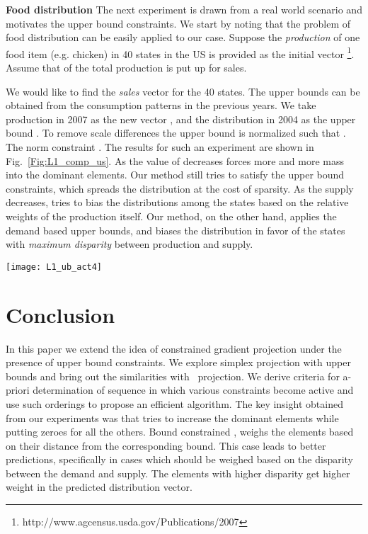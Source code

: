 \documentclass{article}
\def\Lo{~}
\begin{document}
\textbf{Food distribution}
The next experiment is drawn from a real world scenario and motivates the upper bound constraints.
We start by noting that the problem of food distribution can be easily applied to our case. Suppose the \textit{production} of one food item (e.g. chicken) in 40 states in the US is provided as the initial vector \footnote{http://www.agcensus.usda.gov/Publications/2007}. Assume that  of the total production is put up for sales.

We would like to find the \textit{sales} vector  for the 40 states. The upper bounds can be obtained from the consumption patterns in the previous years. We take production in 2007 as the new vector , and the distribution in 2004 as the upper bound . To remove scale differences the upper bound is normalized such that . The norm constraint . The results for such an experiment are shown in Fig.~\ref{Fig:L1_comp_us}. As the value of  decreases  forces more and more mass into the dominant elements. Our method still tries to satisfy the upper bound constraints, which spreads the distribution at the cost of sparsity. As the supply decreases,  tries to bias the distributions among the states based on the relative weights of the production itself. Our method, on the other hand, applies the demand based upper bounds, and biases the distribution in favor of the states with \textit{maximum disparity} between production and supply.
\begin{figure*}[htbp!]
\centering
  \texttt{[image: L1\_ub\_act4]}
  \caption{Red: Actual sales of Chicken in 40 states in 2007. Blue: our method with upper bounds. Green:  only. Note the small region in the circle which has been enlarged.  completely misses this region whereas our method still provides some value to it.\label{Fig:L1_comp_us}
}
\end{figure*}


\section{Conclusion}\label{SEC:Concl}
In this paper we extend the idea of  constrained gradient projection under the presence of upper bound constraints. We explore simplex projection with upper bounds and bring out the similarities with \Lo projection. We derive criteria for a-priori determination of sequence in which various constraints become active and use such orderings to propose an efficient algorithm. The key insight obtained from our experiments was that  tries to increase the dominant elements while putting zeroes for all the others. Bound constrained , weighs the elements based on their distance from the corresponding bound. This case leads to better predictions, specifically in cases which should be weighed based on the disparity between the demand and supply. The elements with higher disparity get higher weight in the predicted distribution vector.


{

}
\end{document}
